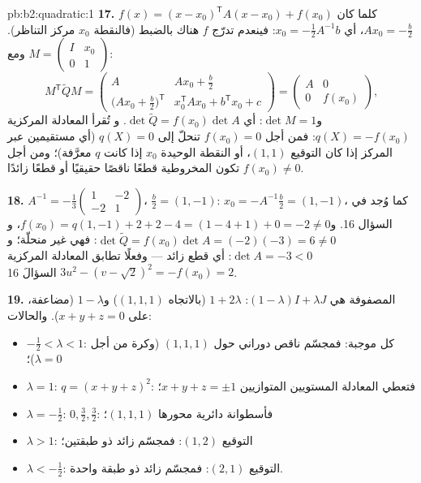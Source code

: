 \begin{solution}{pb:b2:quadratic:1}
\textbf{17.} $f(x) = (x - x_0)^{\mathsf T}A(x - x_0) + f(x_0)$
كلما كان $Ax_0 = -\frac b2$، أي $x_0 = -\frac12A^{-1}b$: فينعدم
تدرّج $f$ هناك بالضبط (فالنقطة $x_0$ مركز
التناظر). ومع $M = \begin{pmatrix} I & x_0\\ 0 &
1\end{pmatrix}$:
\[
M^{\mathsf T}\widetilde QM
= \begin{pmatrix}
A & Ax_0 + \frac b2\\[2pt]
\bigl(Ax_0 + \frac b2\bigr)^{\mathsf T} &
x_0^{\mathsf T}Ax_0 + b^{\mathsf T}x_0 + c
\end{pmatrix}
= \begin{pmatrix} A & 0\\ 0 & f(x_0)\end{pmatrix},
\]
و$\det M = 1$: أي $\det\widetilde Q = f(x_0)\det A$. و
تُقرأ المعادلة المركزية $q(X) = -f(x_0)$: فمن أجل $f(x_0) = 0$ تنحلّ
إلى $q(X) = 0$ (أي مستقيمين عبر المركز إذا كان
التوقيع $(1,1)$، أو النقطة الوحيدة $x_0$ إذا كانت $q$
معرَّفة)؛ ومن أجل $f(x_0) \neq 0$ تكون المخروطية قطعًا ناقصًا حقيقيًا
أو قطعًا زائدًا.

\textbf{18.} $A^{-1} = -\frac13\begin{pmatrix} 1 & -2\\ -2 &
1\end{pmatrix}$، $\frac b2 = (1, -1)$: $x_0 =
-A^{-1}\frac b2 = (1, -1)$، كما وُجد في السؤال 16. و$f(x_0) =
q(1,-1) + 2 + 2 - 4 = (1 - 4 + 1) + 0 = -2 \neq 0$، و
$\det\widetilde Q = f(x_0)\det A = (-2)(-3) = 6 \neq 0$:
فهي غير منحلّة؛ و$\det A = -3 < 0$: أي قطع زائد --- وفعلًا
تطابق المعادلة المركزية $3u^2 - (v - \sqrt2)^2 = -f(x_0) = 2$
السؤالَ 16.

\textbf{19.} المصفوفة هي $(1-\lambda)I + \lambda J$:
 $1 + 2\lambda$ (بالاتجاه $(1,1,1)$) و$1 -
\lambda$ (مضاعفة، على $x + y + z = 0$). والحالات:
\begin{itemize}
  \item $-\frac12 < \lambda < 1$: كل  موجبة:
        فمجسّم ناقص دوراني حول $(1,1,1)$ (وكرة
        من أجل $\lambda = 0$)؛
  \item $\lambda = 1$: $q = (x+y+z)^2$: فتعطي المعادلة
        المستويين المتوازيين $x + y + z = \pm1$؛
  \item $\lambda = -\frac12$:  $0, \frac32,
        \frac32$: فأسطوانة دائرية محورها $(1,1,1)$؛
  \item $\lambda > 1$: التوقيع $(1, 2)$: فمجسّم زائد ذو
        طبقتين؛
  \item $\lambda < -\frac12$: التوقيع $(2, 1)$: فمجسّم
        زائد ذو طبقة واحدة.
\end{itemize}


\end{solution}
